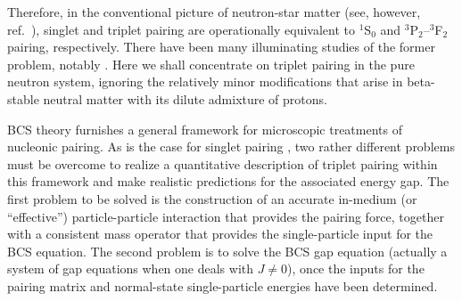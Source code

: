 Therefore, in the conventional picture of neutron-star matter (see, 
however, ref.~\cite{alm3}), singlet and triplet pairing are operationally 
equivalent to $^1$S$_0$ and $^3$P$_2$--$^3$F$_2$ pairing, respectively.  
There have been many illuminating studies of the former problem, notably 
\cite{chen,ccdk,baldo1,kkc,jensen}.  Here we shall concentrate on triplet 
pairing in the pure neutron system, ignoring the relatively minor 
modifications that arise in beta-stable neutral matter with its dilute 
admixture of protons.

BCS theory \cite{bcs,schrieffer} furnishes a general framework for 
microscopic treatments of nucleonic pairing.  As is the case for singlet 
pairing \cite{ccdk,kkc}, two rather different problems must be overcome 
to realize a quantitative description of triplet pairing within
this framework and make realistic predictions for the associated 
energy gap.  The first problem to be solved is the construction of an 
accurate in-medium (or ``effective'') particle-particle interaction 
that provides the pairing force, together with a consistent mass operator 
that provides the single-particle input for the BCS equation.  
The second problem is to solve the BCS gap equation (actually
a system of gap equations when one deals with $J\neq 0$), once
the inputs for the pairing matrix and normal-state single-particle
energies have been determined.

